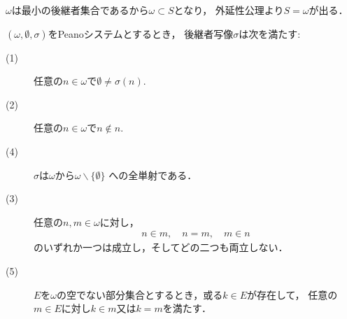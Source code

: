 	\begin{prf}
		$\omega$は最小の後継者集合であるから$\omega \subset S$となり，
		外延性公理より$S = \omega$が出る．
		\QED
	\end{prf}
	
	\begin{screen}
		\begin{thm}[後継者写像は全単射]
		\label{thm:successor_mapping_is_injective}
			$(\omega,\emptyset,\sigma)$をPeanoシステムとするとき，
			後継者写像$\sigma$は次を満たす:
			\begin{description}
				\item[(1)] 任意の$n \in \omega$で$\emptyset \neq \sigma(n)$.
				\item[(2)] 任意の$n \in \omega$で$n \notin n$.
				\item[(4)] $\sigma$は$\omega$から$\omega \backslash \{\emptyset\}$
					への全単射である．
				
				\item[(3)] 任意の$n,m \in \omega$に対し，
					\begin{align}
						n \in m,\quad n = m,\quad m \in n
					\end{align}
					のいずれか一つは成立し，そしてどの二つも両立しない．
				\item[(5)] $E$を$\omega$の空でない部分集合とするとき，或る$k \in E$が存在して，
					任意の$m \in E$に対し$k \in m$又は$k = m$を満たす．
			\end{description}
		\end{thm}
	\end{screen}
	
